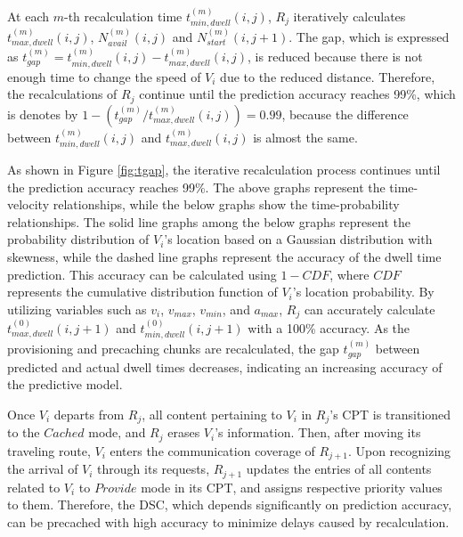 \documentclass[journal]{IEEEtran}
\begin{document}
At each $m$-th recalculation time $t^{(m)}_{min, dwell}(i,j)$, $R_{j}$ iteratively calculates $t^{(m)}_{max, dwell}(i,j)$, $N^{(m)}_{avail}(i,j)$ and $N^{(m)}_{start}(i,j+1)$.
The gap, which is expressed as $t^{(m)}_{gap} = t^{(m)}_{min, dwell}(i,j) - t^{(m)}_{max, dwell}(i,j)$, is reduced because there is not enough time to change the speed of $V_i$ due to the reduced distance.
Therefore, the recalculations of $R_{j}$ continue until the prediction accuracy reaches 99\%, which is denotes by $1-(t^{(m)}_{gap}/t^{(m)}_{max, dwell}(i,j))=0.99$, because the difference between $t^{(m)}_{min, dwell}(i,j)$ and $t^{(m)}_{max, dwell}(i,j)$ is almost the same.

As shown in Figure \ref{fig:tgap}, the iterative recalculation process continues until the prediction accuracy reaches 99\%.
The above graphs represent the time-velocity relationships, while the below graphs show the time-probability relationships.
The solid line graphs among the below graphs represent the probability distribution of $V_{i}$'s location based on a Gaussian distribution with skewness, while the dashed line graphs represent the accuracy of the dwell time prediction.
This accuracy can be calculated using $1-CDF$, where $CDF$ represents the cumulative distribution function of $V_{i}$'s location probability.
By utilizing variables such as $v_{i}$, $v_{max}$, $v_{min}$, and $a_{max}$, $R_{j}$ can accurately calculate $t^{(0)}_{max, dwell}(i,j+1)$ and $t^{(0)}_{min, dwell}(i,j+1)$ with a 100\% accuracy.
As the provisioning and precaching chunks are recalculated, the gap $t^{(m)}_{gap}$ between predicted and actual dwell times decreases, indicating an increasing accuracy of the predictive model.

Once $V_{i}$ departs from $R_{j}$, all content pertaining to $V_{i}$ in $R_{j}$'s CPT is transitioned to the $Cached$ mode, and $R_{j}$ erases $V_{i}$'s information.
Then, after moving its traveling route, $V_{i}$ enters the communication coverage of $R_{j+1}$.
Upon recognizing the arrival of $V_{i}$ through its requests, $R_{j+1}$ updates the entries of all contents related to $V_{i}$ to $Provide$ mode in its CPT, and assigns respective priority values to them.
Therefore, the DSC, which depends significantly on prediction accuracy, can be precached with high accuracy to minimize delays caused by recalculation.
\end{document}
